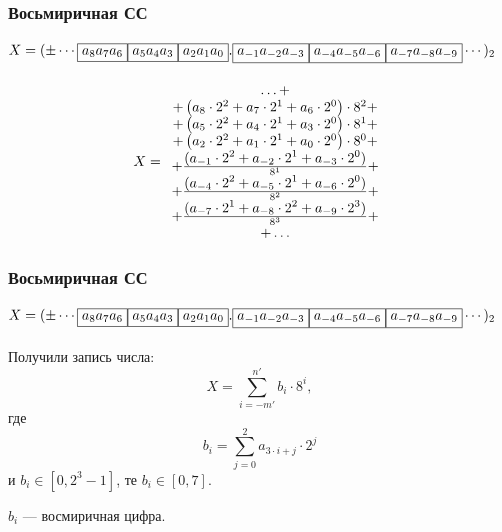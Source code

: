 \begin{frame}
    \frametitle{Восьмиричная СС}
    \framesubtitle{
        \(
        X=(\pm\cdots\fbox{$a_8a_7a_6$}\fbox{$a_5a_4a_3$}\fbox{$a_2a_1a_0$}.
        \fbox{$a_{-1}a_{-2}a_{-3}$}\fbox{$a_{-4}a_{-5}a_{-6}$}\fbox{$a_{-7}a_{-8}a_{-9}$}\cdots)_2
        \)
    }

    \[
        X=
        \begin{array}[c]{c}
            \ldots+\\+
            \left(
            a_{8}\cdot 2^{2} +
            a_{7}\cdot 2^{1} +
            a_{6}\cdot 2^{0}\right)\cdot 8^{2} +\\+

            \left(
            a_{5}\cdot 2^{2} +
            a_{4}\cdot 2^{1} +
            a_{3}\cdot 2^{0}\right)\cdot 8^{1} +\\+

            \left(
            a_{2}\cdot 2^{2} +
            a_{1}\cdot 2^{1} +
            a_{0}\cdot 2^{0}\right)\cdot 8^{0} +\\+

            \frac{\displaystyle
            (a_{-1}\cdot 2^{2} +
            a_{-2}\cdot 2^{1} +
            a_{-3}\cdot 2^{0})
            }{8^{1}} +\\+

            \frac{\displaystyle
            (a_{-4}\cdot 2^{2} +
            a_{-5}\cdot 2^{1} +
            a_{-6}\cdot 2^{0})
            }{8^{2}} +\\+

            \frac{\displaystyle
            (a_{-7}\cdot 2^{1} +
            a_{-8}\cdot 2^{2} +
            a_{-9}\cdot 2^{3})
            }{8^{3}} +\\

            +\ldots
        \end{array}
    \]
\end{frame}

\begin{frame}
    \frametitle{Восьмиричная СС}
    \framesubtitle{
        \(
        X=(\pm\cdots\fbox{$a_8a_7a_6$}\fbox{$a_5a_4a_3$}\fbox{$a_2a_1a_0$}.
        \fbox{$a_{-1}a_{-2}a_{-3}$}\fbox{$a_{-4}a_{-5}a_{-6}$}\fbox{$a_{-7}a_{-8}a_{-9}$}\cdots)_2
        \)
    }
    
    Получили запись числа:
    \[
        X=\sum_{i=-m'}^{n'}b_{i}\cdot 8^{i},
    \]
    где 
    \[
        b_{i}=\sum_{j=0}^{2}a_{3\cdot i + j}\cdot 2^{j}
    \]
    и $b_i\in [0,2^{3}-1]$, те $b_i\in [0,7]$.
    
    $b_i$ --- \alert{восмиричная} цифра.
\end{frame}


